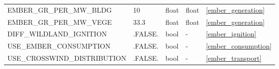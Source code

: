 \begin{landscape}
\begin{center}
\begin{longtable}{lllll}
EMBER\_GR\_PER\_MW\_BLDG                     & 10                         & float                  & float                              & \ref{ember_generation}               \\
EMBER\_GR\_PER\_MW\_VEGE                     & 33.3                       & float                  & float                              & \ref{ember_generation}               \\
DIFF\_WILDLAND\_IGNITION                     & .FALSE.                    & bool                   & -                                  & \ref{ember_ignition}                 \\
USE\_EMBER\_CONSUMPTION                      & .FALSE.                    & bool                   & -                                  & \ref{ember_consumption}            \\
USE\_CROSSWIND\_DISTRIBUTION                 & .FALSE.                    & bool                   & -                                  & \ref{ember_transport}             \\



\end{longtable}
\end{center}
\end{landscape}
